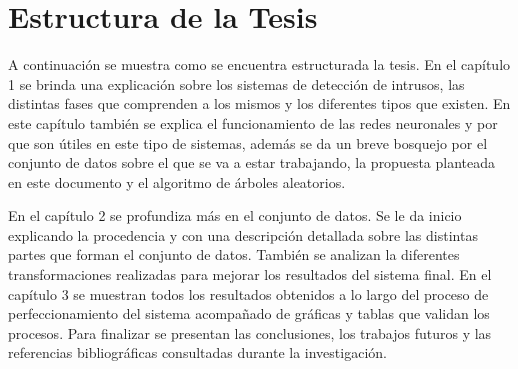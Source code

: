 \section*{Estructura de la Tesis}
A continuación se muestra como se encuentra estructurada la tesis. En el capítulo 1 se brinda una explicación sobre los sistemas de detección de intrusos, las distintas fases que comprenden a los mismos y los diferentes tipos que existen. En este capítulo también se explica el funcionamiento de las redes neuronales y por que son útiles en este tipo de sistemas, además se da un breve bosquejo por el conjunto de datos sobre el que se va a estar trabajando, la propuesta planteada en este documento y el algoritmo de árboles aleatorios.

En el capítulo 2 se profundiza m\'as en el conjunto de datos. Se le da inicio  explicando la procedencia y con una descripción detallada sobre las distintas partes que forman el conjunto de datos. También se analizan la diferentes transformaciones realizadas para mejorar los resultados del sistema final. En el capítulo 3 se muestran todos los resultados obtenidos a lo largo del proceso de perfeccionamiento del sistema acompañado de gráficas y tablas que validan los procesos. Para finalizar se presentan las conclusiones, los trabajos futuros y las referencias bibliográficas consultadas durante la investigación.




